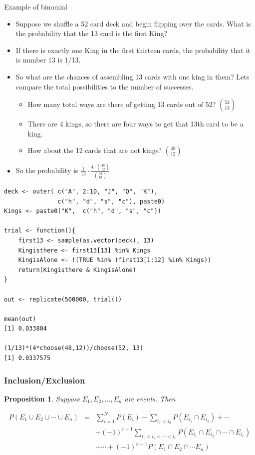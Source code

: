 \documentclass[handout]{beamer}
\newtheorem{prop}{Proposition}
\numberwithin{equation}{section}
\begin{document}
\begin{frame}{Example of binomial}
\begin{itemize}
\item Suppose we shuffle a 52 card deck and begin flipping over the cards.  What is the probability that the 13 card is the first King?\pause
\item If there is exactly one King in the first thirteen cards, the probability that it is number 13 is 1/13. \pause
\item So what are the chances of assembling 13 cards with one king in them?  Lets compare the total possibilities to the number of successes.\pause 
\begin{itemize}
\item How many total ways are there of getting 13 cards out of 52? \pause  ${52\choose 13}$\pause
\item There are 4 kings, so there are four ways to get that 13th card to be a king. \pause
\item How about the 12 cards that are not kings?  \pause ${48\choose 12}$
\end{itemize}
\item \pause  So the probability is $\frac{1}{13}\cdot \frac{4\cdot{48\choose 12}}{{52\choose13}}$
\end{itemize}

\end{frame}

\begin{frame}[fragile]
\begin{verbatim}
deck <- outer( c("A", 2:10, "J", "Q", "K"), 
		       c("h", "d", "s", "c"), paste0)
Kings <- paste0("K",  c("h", "d", "s", "c"))

trial <- function(){
	first13 <- sample(as.vector(deck), 13)
	Kingisthere <- first13[13] %in% Kings 
	KingisAlone <- !(TRUE %in% (first13[1:12] %in% Kings))
	return(Kingisthere & KingisAlone)
}

out <- replicate(500000, trial())

mean(out)
[1] 0.033804

(1/13)*(4*choose(48,12))/choose(52, 13)
[1] 0.0337575
\end{verbatim}
\end{frame}


\begin{frame}
\frametitle{Inclusion/Exclusion}

\begin{prop} 
Suppose $E_{1}, E_{2}, \hdots, E_{n}$ are events.  Then 

\begin{eqnarray}
P(E_{1} \cup E_{2} \cup \cdots \cup E_{n} ) & = & \sum_{i=1}^{N} P(E_{i} ) - \sum_{i_{1} <i_{2} } P(E_{i_{1}} \cap E_{i_{2} } )+ \cdots \nonumber \\
& & + (-1)^{r+ 1} \sum_{i_{1}<i_{2} < \cdots< i_{r} } P(E_{i_{1}} \cap E_{i_{2}}\cap \cdots \cap E_{i_{r}} ) \nonumber \\
& & + \cdots + (-1)^{n+1} P(E_{1} \cap E_{2} \cap \cdots E_{n} ) \nonumber 
\end{eqnarray}
\end{prop}

\end{frame}
\end{document}
